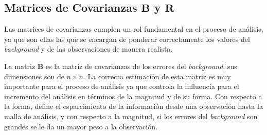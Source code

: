 \subsection{Matrices de Covarianzas $\textbf{B}$ y $\textbf{R}$}
Las matrices de covarianzas cumplen un rol fundamental en el proceso de análisis, ya que son ellas las que se encargan de ponderar correctamente los valores del \emph{background} y de las observaciones de manera realista. 

La matriz $\textbf{B}$ es la matriz de covarianzas de los errores del \emph{background}, sus dimensiones son de $n\times n$. La correcta estimación de esta matriz es muy importante para el proceso de análisis ya que  controla la influencia para el incremento del análisis en términos de la magnitud y de su forma. Con respecto a la forma, define el esparcimiento de la información desde una observación hasta la malla de análisis, y con respecto a la magnitud, si los errores del \emph{background} son grandes se le da un mayor peso a la observación.

